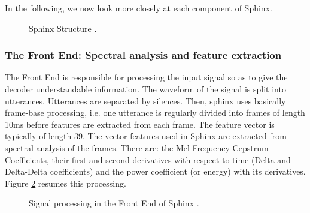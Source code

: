In the following, we now look more closely at each component of Sphinx. 

\begin{figure}[h!]
\caption{Sphinx Structure \cite{understand_sphinx}.}
\label{fig:sphinx_struc}
\end{figure}

\subsubsection*{The Front End: Spectral analysis and feature extraction}
The Front End is responsible for processing the input signal so as to give the decoder understandable information. The waveform of the signal is split into utterances. Utterances are separated by silences. Then, sphinx uses basically frame-base processing, i.e. one utterance is regularly divided into frames of length 10ms before features are extracted from each frame. The feature vector is typically of length 39. The vector features used in Sphinx are extracted from spectral analysis of the frames. There are: the Mel Frequency Cepstrum Coefficients, their first and second derivatives with respect to time (Delta and Delta-Delta coefficients) and the power coefficient (or energy) with its derivatives. Figure \ref{fig:sig_proc_sphx} resumes this processing. 

\begin{figure}[h!]
\caption{Signal processing in the Front End of Sphinx \cite{eff_algo}.}
\label{fig:sig_proc_sphx}
\end{figure}

